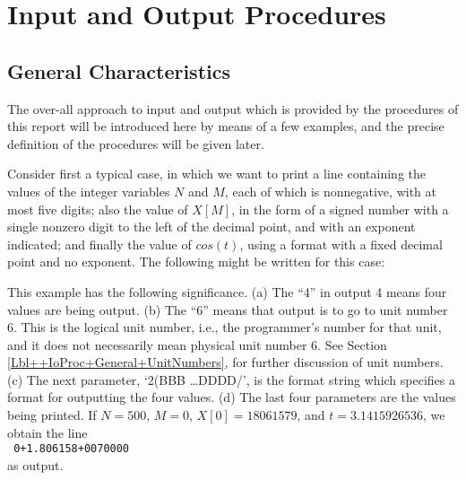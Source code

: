\documentclass[a4paper,11pt]{article}
\begin{document}
\section{Input and Output Procedures}

\subsection{General Characteristics}
\label{Lbl++IoProc+General}

The over-all approach to input and output which is provided by the
procedures of this report will be introduced here by means of a few
examples, and the precise definition of the procedures will be given
later.

Consider first a typical case, in which we want to print a line
containing the values of the integer variables $N$ and $M$, each of
which is nonnegative, with at most five digits; also the value of
$X[M]$, in the form of a signed number with a single nonzero digit to
the left of the decimal point, and with an exponent indicated; and
finally the value of $cos(t)$, using a format with a fixed decimal
point and no exponent.  The following might be written for this case:


This example has the following significance. (a) The ``4'' in output 4
means four values are being output.  (b) The ``6'' means that output
is to go to unit number 6.  This is the logical unit number, i.e., the
programmer's number for that unit, and it does not necessarily mean
physical unit number 6.  See Section
\ref{Lbl++IoProc+General+UnitNumbers}, for further discussion of unit
numbers.  (c) The next parameter, `2(BBB \dots DDDD/', is the format
string which specifies a format for outputting the four values.  (d)
The last four parameters are the values being printed.  If $N = 500$,
$M = 0$, $X[0] = 18061579$, and $t = 3.1415926536$, we obtain the
line\vspace{0.5em}\\ {\tt
\blankchar\blankchar\blankchar\blankchar{}\blankchar\blankchar\blankchar\blankchar\blankchar\blankchar\blankchar{}0\blankchar\blankchar\blankchar+1.806158\ten{}+007\blankchar\blankchar{}\blankchar{}0000}\vspace{0.5em}\\
as output.
\end{document}

